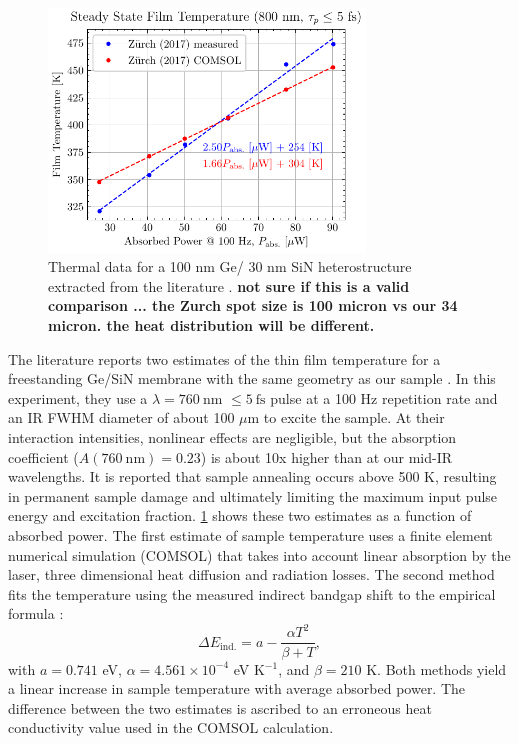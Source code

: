 \begin{figure}
	\centering
	\includegraphics[width=0.75\textwidth]{figures/chap4/COMSOL_temp_power.pdf}
	\caption{Thermal data for a 100 nm Ge/ 30 nm SiN heterostructure extracted from the literature \cite{zurchDirectSimultaneousObservation2017}. \textbf{not sure if this is a valid comparison ... the Zurch spot size is 100 micron vs our 34 micron. the heat distribution will be different.}}
	\label{fig:COMSOL_temp_power}
\end{figure}

The literature reports two estimates of the thin film temperature for a freestanding Ge/SiN membrane with the same geometry as our sample \cite{zurchDirectSimultaneousObservation2017}. In this experiment, they use a $\lambda=760 \ \textrm{nm}$ $\le5 \ \textrm{fs}$ pulse at a 100 Hz repetition rate and an IR FWHM diameter of about 100 $\mu$m to excite the sample. At their interaction intensities, nonlinear effects are negligible, but the absorption coefficient ($A (760 \ \textrm{nm}) = 0.23$) is about 10x higher than at our mid-IR wavelengths. It is reported that sample annealing occurs above 500 K, resulting in permanent sample damage and ultimately limiting the maximum input pulse energy and excitation fraction. \cref{fig:COMSOL_temp_power} shows these two estimates as a function of absorbed power. The first estimate of sample temperature uses a finite element numerical simulation (COMSOL) that takes into account linear absorption by the laser, three dimensional heat diffusion and radiation losses. The second method fits the temperature using the measured indirect bandgap shift to the empirical formula \cite{vinaTemperatureDependenceDielectric1984}:
\begin{equation}
\Delta E_{\textrm{ind.}} = a - \frac{\alpha T^2}{\beta + T},
\label{eqn:CB_shift_temp}
\end{equation}
with $a = 0.741$ eV, $\alpha=4.561 \times 10^{-4}$ eV K$^{-1}$, and $\beta = 210$ K. Both methods yield a linear increase in sample temperature with average absorbed power. The difference between the two estimates is ascribed to an erroneous heat conductivity value used in the COMSOL calculation.


